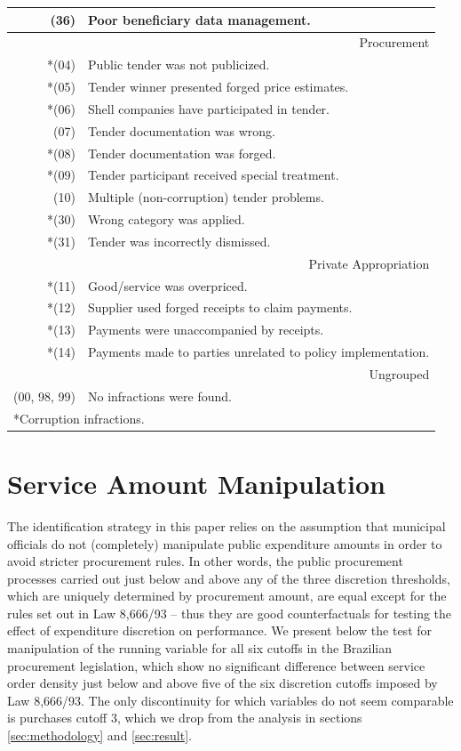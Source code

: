 \documentclass[11pt]{article}
\begin{document}
\begin{table}[!htbp]
\begin{tabular}{r|l}
   (36) & Poor beneficiary data management. \\
  \hline
  \multicolumn{2}{r}{Procurement} \\
  \hline
  *(04) & Public tender was not publicized. \\
  *(05) & Tender winner presented forged price estimates. \\
  *(06) & Shell companies have participated in tender. \\
   (07) & Tender documentation was wrong. \\
  *(08) & Tender documentation was forged. \\
  *(09) & Tender participant received special treatment. \\
   (10) & Multiple (non-corruption) tender problems. \\
  *(30) & Wrong category was applied. \\
  *(31) & Tender was incorrectly dismissed. \\
  \hline
  \multicolumn{2}{r}{Private Appropriation} \\
  \hline
  *(11) & Good/service was overpriced. \\
  *(12) & Supplier used forged receipts to claim payments. \\
  *(13) & Payments were unaccompanied by receipts. \\
  *(14) & Payments made to parties unrelated to policy implementation. \\
  \hline
  \multicolumn{2}{r}{Ungrouped} \\
  \hline
  (00, 98, 99) & No infractions were found. \\
  \hline

  \hline
  \multicolumn{2}{l}{*Corruption infractions.}
  \end{tabular}
\end{table}

\newpage

\section{Service Amount Manipulation}\label{sec:appendixC}

The identification strategy in this paper relies on the assumption that municipal officials do not (completely) manipulate public expenditure amounts in order to avoid stricter procurement rules. In other words, the public procurement processes carried out just below and above any of the three discretion thresholds, which are uniquely determined by procurement amount, are equal except for the rules set out in Law 8,666/93 -- thus they are good counterfactuals for testing the effect of expenditure discretion on performance. We present below the \citet{McCraryManipulationRunningVariable2008} test for manipulation of the running variable for all six cutoffs in the Brazilian procurement legislation, which show no significant difference between service order density just below and above five of the six discretion cutoffs imposed by Law 8,666/93. The only discontinuity for which variables do not seem comparable is purchases cutoff 3, which we drop from the analysis in sections \ref{sec:methodology} and \ref{sec:result}.
\end{document}
